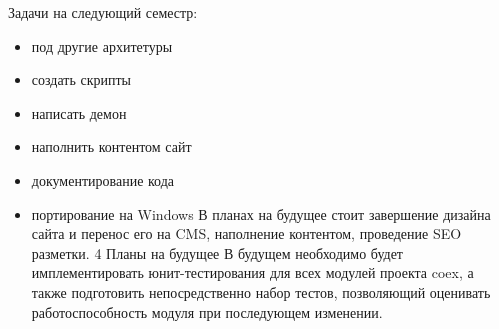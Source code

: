 Задачи на следующий семестр:
\begin{itemize}
  \item под другие архитетуры
  \item создать скрипты 
  \item написать демон
  \item наполнить контентом сайт
  \item документирование кода
  \item портирование на Windows
  В планах на будущее стоит завершение дизайна сайта и перенос его на CMS, наполнение контентом, проведение SEO разметки.
  4 Планы на будущее
В будущем необходимо будет имплементировать юнит-тестирования для всех модулей проекта coex, а также подготовить непосредственно набор тестов, позволяющий оценивать работоспособность модуля при последующем изменении.
\end{itemize}
